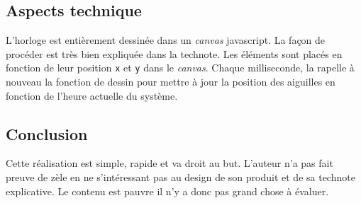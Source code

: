 \documentclass[a4paper,11pt]{article}
\begin{document}
\subsection{Aspects technique}
L'horloge est entièrement dessinée dans un \textit{canvas} javascript. La façon de procéder est très bien expliquée dans la technote. Les éléments sont placés en fonction de leur position \texttt{x} et \texttt{y} dans le \textit{canvas}. Chaque milliseconde, la rapelle à nouveau la fonction de dessin pour mettre à jour la position des aiguilles en fonction de l'heure actuelle du système.
\subsection{Conclusion}
Cette réalisation est simple, rapide et va droit au but. L'auteur n'a pas fait preuve de zèle en ne s'intéressant pas au design de son produit et de sa technote explicative. Le contenu est pauvre il n'y a donc pas grand chose à évaluer.
\end{document}
